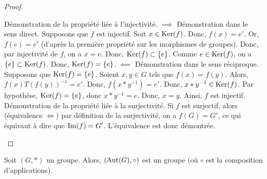 \documentclass[12pt,a4paper]{report}
\begin{document}
\begin{proof}
    \begin{outline}[enumerate]
        \1 Démonstration de la propriété liée à l'injectivité.
            \2 $\implies$ Démonstration dans le sens direct.
                \3 Supposons que $f$ est injectif.
                \3 Soit $x \in \mathrm{Ker}(f)$. Donc, $f(x) = e'$.
                \3 Or, $f(e) = e'$ (d'après la première propriété sur les morphismes de groupes).
                \3 Donc, par injectivité de $f$, on a $x = e$.
                \3 Donc, $\mathrm{Ker}(f) \subset \{e\}$.
                \3 Comme $e \in \mathrm{Ker}(f)$, on a $\{e\} \subset \mathrm{Ker}(f)$.
                \3 Donc, $\mathrm{Ker}(f) = \{e\}$.
            \2 $\impliedby$ Démonstration dans le sens réciproque.
                \3 Supposons que $\mathrm{Ker}(f) = \{e\}$.
                \3 Soient $x,y \in G$ tels que $f(x) = f(y)$.
                \3 Alors, $f(x) T (f(y))^{-1} = e'$.
                \3 Donc, $f(x * y^{-1}) = e'$.
                \3 Donc, $x * y^{-1} \in \mathrm{Ker}(f)$.
                \3 Par hypothèse, $\mathrm{Ker}(f) = \{e\}$, donc $x * y^{-1} = e$.
                \3 Donc, $x = y$.
                \3 Ainsi, $f$ est injectif.
        \1 Démonstration de la propriété liée à la surjectivité.
            \2 Si $f$ est surjectif, alors (équivalence $\iff$) par définition de la surjectivité, on a $f(G) = G'$, ce qui équivaut à dire que $\mathrm{Im}(f) = G'$. L'équivalence est donc démontrée.
    \end{outline}
\end{proof}

\begin{property}
    Soit $(G,*)$ un groupe. Alors, $(\mathrm{Aut}(G),\circ)$ est un groupe (où $\circ$ est la composition d'applications).
\end{property}
\end{document}
